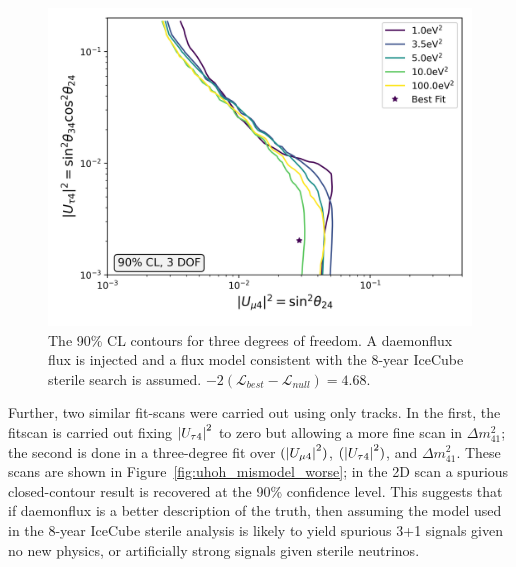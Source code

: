 \documentclass[main.tex]{subfiles}
\begin{document}
\begin{figure}  
    \centering
    \includegraphics[width=0.7\linewidth]{figures/joint_daemon_mismodel_Realization_daemon_Asimov_sterile_0_cl0.9_dof3.png}
    \caption{The 90\% CL contours for three degrees of freedom. A daemonflux flux is injected and a flux model consistent with the 8-year IceCube sterile search is assumed. $-2(\mathcal{L}_{best}-\mathcal{L}_{null})=4.68$.}\label{fig:uhoh_mismodel}
\end{figure}

Further, two similar fit-scans were carried out using only tracks. 
In the first, the fitscan is carried out fixing $\left| U_{\tau 4} \right|^{2}$ to zero but allowing a more fine scan in $\Delta m_{41}^{2}$; the second is done in a three-degree fit over $(\left| U_{\mu 4} \right|^{2})$, $(\left| U_{\tau 4} \right|^{2})$, and $\Delta m_{41}^{2}$. 
These scans are shown in Figure~\ref{fig:uhoh_mismodel_worse}; in the 2D scan a spurious closed-contour result is recovered at the 90\% confidence level. 
This suggests that if daemonflux is a better description of the truth, then assuming the model used in the 8-year IceCube sterile analysis is likely to yield spurious 3+1 signals given no new physics, or artificially strong signals given sterile neutrinos.
\end{document}
